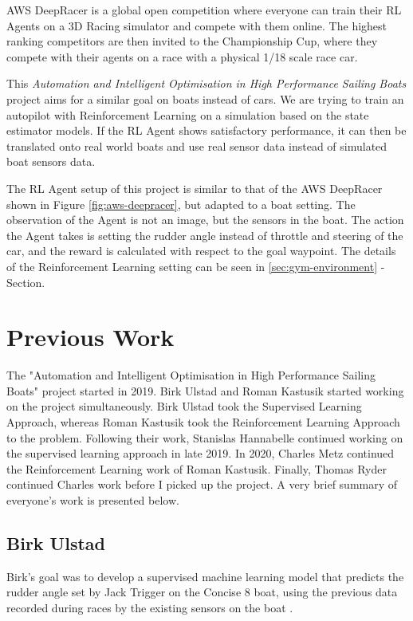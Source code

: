 \documentclass[12pt,twoside]{report}
\begin{document}
AWS DeepRacer is a global open competition where everyone can train their RL Agents on a 3D Racing simulator and compete with them online. The highest ranking competitors are then invited to the Championship Cup, where they compete with their agents on a race with a physical 1/18 scale race car.

This \textit{Automation and Intelligent Optimisation in High Performance Sailing Boats} project aims for a similar goal on boats instead of cars. We are trying to train an autopilot with Reinforcement Learning on a simulation based on the state estimator models. If the RL Agent shows satisfactory performance, it can then be translated onto real world boats and use real sensor data instead of simulated boat sensors data.

The RL Agent setup of this project is similar to that of the AWS DeepRacer shown in Figure \ref{fig:aws-deepracer}, but adapted to a boat setting. The observation of the Agent is not an image, but the sensors in the boat. The action the Agent takes is setting the rudder angle instead of throttle and steering of the car, and the reward is calculated with respect to the goal waypoint. The details of the Reinforcement Learning setting can be seen in \ref{sec:gym-environment} -  Section.


\section{Previous Work}
The "Automation and Intelligent Optimisation in High Performance Sailing Boats" project started in 2019. Birk Ulstad and Roman Kastusik started working on the project simultaneously. Birk Ulstad took the Supervised Learning Approach, whereas Roman Kastusik took the Reinforcement Learning Approach to the problem. Following their work, Stanislas Hannabelle continued working on the supervised learning approach in late 2019. In 2020, Charles Metz continued the Reinforcement Learning work of Roman Kastusik. Finally, Thomas Ryder continued Charles work before I picked up the project. A very brief summary of everyone's work is presented below.

\subsection{Birk Ulstad}
Birk's goal was to develop a supervised machine learning model that predicts the rudder angle set by Jack Trigger on the Concise 8 boat, using the previous data recorded during races by the existing sensors on the boat \cite{birk}.
\end{document}
